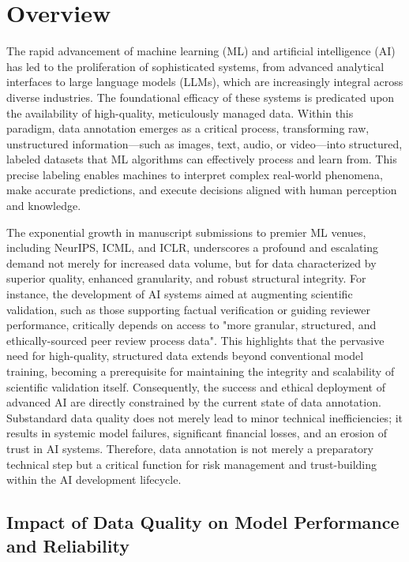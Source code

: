 \section{Overview}
\label{Chapter1-overview}

The rapid advancement of machine learning (ML) and artificial intelligence (AI) has led to the proliferation of sophisticated systems, from advanced analytical interfaces to large language models (LLMs), which are increasingly integral across diverse industries. The foundational efficacy of these systems is predicated upon the availability of high-quality, meticulously managed data. Within this paradigm, data annotation emerges as a critical process, transforming raw, unstructured information—such as images, text, audio, or video—into structured, labeled datasets that ML algorithms can effectively process and learn from. This precise labeling enables machines to interpret complex real-world phenomena, make accurate predictions, and execute decisions aligned with human perception and knowledge. 

The exponential growth in manuscript submissions to premier ML venues, including NeurIPS, ICML, and ICLR, underscores a profound and escalating demand not merely for increased data volume, but for data characterized by superior quality, enhanced granularity, and robust structural integrity. For instance, the development of AI systems aimed at augmenting scientific validation, such as those supporting factual verification or guiding reviewer performance, critically depends on access to "more granular, structured, and ethically-sourced peer review process data". This highlights that the pervasive need for high-quality, structured data extends beyond conventional model training, becoming a prerequisite for maintaining the integrity and scalability of scientific validation itself. Consequently, the success and ethical deployment of advanced AI are directly constrained by the current state of data annotation. Substandard data quality does not merely lead to minor technical inefficiencies; it results in systemic model failures, significant financial losses, and an erosion of trust in AI systems. Therefore, data annotation is not merely a preparatory technical step but a critical function for risk management and trust-building within the AI development lifecycle. 


\subsection*{Impact of Data Quality on Model Performance and Reliability}

